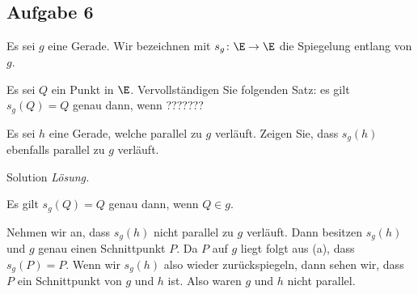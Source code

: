 \subsection*{Aufgabe 6}
Es sei $g$ eine Gerade. Wir bezeichnen mit $s_g\colon \E\to \E$ die Spiegelung entlang von $g$. 
\bnal
\item Es sei $Q$ ein Punkt in $\E$. Vervollst\"andigen Sie folgenden Satz:  es gilt $s_g(Q)=Q$ genau dann, wenn ???????
\item Es sei $h$ eine Gerade, welche parallel zu $g$ verl\"auft. Zeigen Sie, dass $s_g(h)$ ebenfalls parallel zu $g$ verl\"auft.
\enm

\begin{taggedblock}{Solution}
\noindent \emph{L\"osung.}\mbox{}
\bnal
\item  Es gilt $s_g(Q)=Q$ genau dann, wenn $Q\in g$. 
\item  Nehmen wir an, dass $s_g(h)$ nicht  parallel zu $g$ verl\"auft. Dann besitzen $s_g(h)$ und $g$ genau einen Schnittpunkt $P$.
Da $P$ auf $g$ liegt folgt aus (a), dass $s_g(P)=P$. Wenn wir $s_g(h)$ also wieder zur\"uckspiegeln, dann sehen wir, dass $P$ ein Schnittpunkt von $g$ und $h$ ist. Also waren $g$ und $h$ nicht parallel.
\enm
\end{taggedblock}



